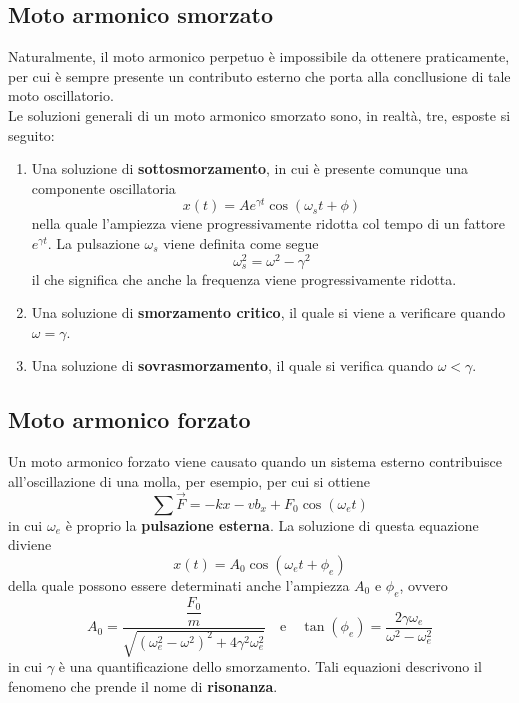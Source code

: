 \documentclass[a4paper]{extarticle}
\begin{document}
\subsection{Moto armonico smorzato}
Naturalmente, il moto armonico perpetuo è impossibile da ottenere praticamente, per cui è sempre presente un contributo esterno che porta alla concllusione di tale moto oscillatorio.\\
Le soluzioni generali di un moto armonico smorzato sono, in realtà, tre, esposte si seguito:
\begin{enumerate}
  \item Una soluzione di \textbf{sottosmorzamento}, in cui è presente comunque una componente oscillatoria
  \[\boxed{x(t)=A e^{\gamma t} \cos(\omega_s t + \phi)}\]
  nella quale l'ampiezza viene progressivamente ridotta col tempo di un fattore $e^{\gamma t}$. La pulsazione $\omega_s$ viene definita come segue
  \[\boxed{\omega_s^2 = \omega^2 - \gamma^2}\]
  il che significa che anche la frequenza viene progressivamente ridotta.

  \item Una soluzione di \textbf{smorzamento critico}, il quale si viene a verificare quando $\omega=\gamma$.

  \item Una soluzione di \textbf{sovrasmorzamento}, il quale si verifica quando $\omega<\gamma$.
\end{enumerate}

\vspace{1em}
\noindent
\subsection{Moto armonico forzato}
Un moto armonico forzato viene causato quando un sistema esterno contribuisce all'oscillazione di una molla, per esempio, per cui si ottiene
\[\sum \vec F = -kx - vb_x + F_0 \cos(\omega_e t)\]
in cui $\omega_e$ è proprio la \textbf{pulsazione esterna}. La soluzione di questa equazione diviene
\[x(t)=A_0 \cos(\omega_e t + \phi_e)\]
della quale possono essere determinati anche l'ampiezza $A_0$ e $\phi_e$, ovvero
\[\boxed{A_0 = \frac{\dfrac{F_0}{m}}{\sqrt{(\omega_e^2 - \omega^2)^2 + 4\gamma^2 \omega_e^2}}} \hspace{1em} \text{e} \hspace{1em} \boxed{\tan(\phi_e) = \frac{2 \gamma \omega_e}{\omega^2 - \omega_e^2}}\]
in cui $\gamma$ è una quantificazione dello smorzamento. Tali equazioni descrivono il fenomeno che prende il nome di \textbf{risonanza}.
\end{document}
